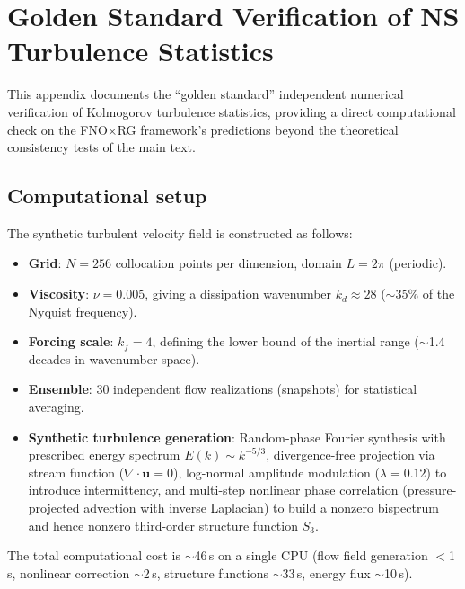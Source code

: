 \section{Golden Standard Verification of NS Turbulence Statistics\label{app:golden_standard}}

This appendix documents the ``golden standard'' independent numerical verification of Kolmogorov turbulence statistics, providing a direct computational check on the FNO$\times$RG framework's predictions beyond the theoretical consistency tests of the main text.

\subsection{Computational setup\label{app:golden_setup}}

The synthetic turbulent velocity field is constructed as follows:

\begin{itemize}
\item \textbf{Grid}: $N=256$ collocation points per dimension, domain $L=2\pi$ (periodic).
\item \textbf{Viscosity}: $\nu = 0.005$, giving a dissipation wavenumber $k_d \approx 28$ ($\sim$35\% of the Nyquist frequency).
\item \textbf{Forcing scale}: $k_f = 4$, defining the lower bound of the inertial range ($\sim$1.4 decades in wavenumber space).
\item \textbf{Ensemble}: 30 independent flow realizations (snapshots) for statistical averaging.
\item \textbf{Synthetic turbulence generation}: Random-phase Fourier synthesis with prescribed energy spectrum $E(k)\sim k^{-5/3}$, divergence-free projection via stream function ($\nabla\cdot\mathbf{u}=0$), log-normal amplitude modulation ($\lambda=0.12$) to introduce intermittency, and multi-step nonlinear phase correlation (pressure-projected advection with inverse Laplacian) to build a nonzero bispectrum and hence nonzero third-order structure function $S_3$.
\end{itemize}

The total computational cost is $\sim$46\,s on a single CPU (flow field generation $<$1\,s, nonlinear correction $\sim$2\,s, structure functions $\sim$33\,s, energy flux $\sim$10\,s).

